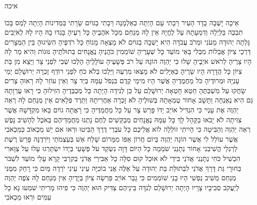 \documentclass[../main/main.tex]{subfiles}
\begin{document}
\thispagestyle{empty}
\Incipit{}איכה
\cleardoublepage
\RTLmulticolcolumns
\begin{multicols*}{\ncols}
אֵיכָה יָשְׁבָה בָדָד הָעִיר רַּבָתִי עָם הָיְתָה כְּאַלְמָנָה רַּבָתִי בַגּוֹיִם שָׂרָתִי בַּמְּדִינוֹת הָיְתָה לָמַס \ClosedSection{}בָּכוֹ תִבְכֶּה בַּלַּיְלָה וְדִמְעָתָהּ עַל לֶחֱיָהּ אֵין לָהּ מְנַחֵם מִכָּל אֹהֲבֶיהָ כָּל רֵעֶיהָ בָּגְדוּ בָהּ הָיוּ לָהּ לְאֹיְבִים \ClosedSection{}גָּלְתָה יְהוּדָה מֵעֹנִי וּמֵרֹב עֲבֹדָה הִיא יָשְׁבָה בַגּוֹיִם לֹא מָצְאָה מָנוֹחַ כָּל רֹדְפֶיהָ הִשִּׂיגוּהָ בֵּין הַמְּצָרִים \ClosedSection{}דַּרְכֵי צִיּוֹן אֲבֵלוֹת מִבְּלִי בָּאֵי מוֹעֵד כָּל שְׁעָרֶיהָ שׁוֹמֵמִין כֹּהֲנֶיהָ נֶאֱנָחִים בְּתוּלֹתֶיהָ נּוּגוֹת וְהִיא מַר לָהּ \ClosedSection{}הָיוּ צָרֶיהָ לְרֹאשׁ אֹיְבֶיהָ שָׁלוּ כִּי יַהְוֶה הוֹגָהּ עַל רֹב פְּשָׁעֶיהָ עוֹלָלֶיהָ הָלְכוּ שְׁבִי לִפְנֵי צָר \ClosedSection{}וַיֵּצֵא מִן בַּת צִיּוֹן כָּל הֲדָרָהּ הָיוּ שָׂרֶיהָ כְּאַיָּלִים לֹא מָצְאוּ מִרְעֶה וַיֵּלְכוּ בְלֹא כֹחַ לִפְנֵי רוֹדֵף \ClosedSection{}זָכְרָה יְרוּשָׁלֵם יְמֵי עָנְיָהּ וּמְרוּדֶיהָ כֹּל מַחֲמֻדֶיהָ אֲשֶׁר הָיוּ מִימֵי קֶדֶם בִּנְפֹל עַמָּהּ בְּיַד צָר וְאֵין עוֹזֵר לָהּ רָאוּהָ צָרִים שָׂחֲקוּ עַל מִשְׁבַּתֶּהָ \ClosedSection{}חֵטְא חָטְאָה יְרוּשָׁלֵם עַל כֵּן לְנִידָה הָיָתָה כָּל מְכַבְּדֶיהָ הִזִּילוּהָ כִּי רָאוּ עֶרְוָתָהּ גַּם הִיא נֶאֶנְחָה וַתָּשָׁב אָחוֹר \ClosedSection{}טֻמְאָתָהּ בְּשׁוּלֶיהָ לֹא זָכְרָה אַחֲרִיתָהּ וַתֵּרֶד פְּלָאִים אֵין מְנַחֵם לָהּ רְאֵה יַהְוֶה אֶת עָנְיִי כִּי הִגְדִּיל אוֹיֵב \ClosedSection{}יָדוֹ פָּרַשׂ צָר עַל כָּל מַחֲמַדֶּיהָ כִּי רָאֲתָה גוֹיִם בָּאוּ מִקְדָּשָׁהּ אֲשֶׁר צִוִּיתָה לֹא יָבֹאוּ בַקָּהָל לָךְ \ClosedSection{}כָּל עַמָּהּ נֶאֱנָחִים מְבַקְּשִׁים לֶחֶם נָתְנוּ מַחֲמַדֵּיהֶם\SubEnd{} בְּאֹכֶל לְהָשִׁיב נָפֶשׁ רְאֵה יַהְוֶה וְהַבִּיטָה כִּי הָיִיתִי זוֹלֵלָה \ClosedSection{}לוֹא אֲלֵיכֶם כָּל עֹבְרֵי דֶרֶךְ הַבִּיטוּ וּרְאוּ אִם יֵשׁ מַכְאוֹב כְּמַכְאֹבִי אֲשֶׁר עוֹלַל לִי אֲשֶׁר הוֹגָה יַהְוֶה בְּיוֹם חֲרוֹן אַפּוֹ \ClosedSection{}מִמָּרוֹם שָׁלַח אֵשׁ בְּעַצְמֹתַי וַיֹּרִדֶנָּה\SubEnd{} פָּרַשׂ רֶשֶׁת לְרַגְלַי הֱשִׁיבַנִי אָחוֹר נְתָנַנִי שֹׁמֵמָה כָּל הַיּוֹם דָּוָה \ClosedSection{}נִשְׂקַד עֹל פְּשָׁעַי בְּיָדוֹ יִשְׂתָּרְגוּ עָלוּ עַל צַוָּארִי הִכְשִׁיל כֹּחִי נְתָנַנִי אֲדֹנַי בִּידֵי לֹא אוּכַל קוּם \ClosedSection{}סִלָּה כָל אַבִּירַי אֲדֹנַי בְּקִרְבִּי קָרָא עָלַי מוֹעֵד לִשְׁבֹּר בַּחוּרָי גַּת דָּרַךְ אֲדֹנַי לִבְתוּלַת בַּת יְהוּדָה \ClosedSection{}עַל אֵלֶּה אֲנִי בוֹכִיָּה עֵינִי עֵינִי יֹרְדָה מַּיִם כִּי רָחַק מִמֶּנִּי מְנַחֵם מֵשִׁיב נַפְשִׁי הָיוּ בָנַי שׁוֹמֵמִים כִּי גָבַר אוֹיֵב \ClosedSection{}פֵּרְשָׂה צִיּוֹן בְּיָדֶיהָ אֵין מְנַחֵם לָהּ צֹפֶה\SubEnd{} יַהְוֶה לְיַעֲקֹב סְבִיבָיו צָרָיו הָיְתָה יְרוּשָׁלֵם לְנִדָּה בֵּינֵיהֶם \ClosedSection{}צַדִּיק הוּא יַהְוֶה כִּי פִיהוּ מָרִיתִי שִׁמְעוּ נָא כָל עַמִּים וּרְאוּ מַכְאֹבִי 
\end{multicols*}
\end{document}
